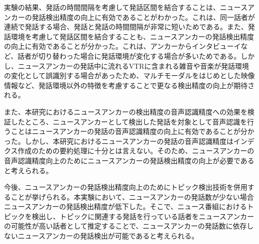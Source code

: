 実験の結果、発話の時間間隔を考慮して発話区間を結合することは、ニュースアンカーの発話検出精度の向上に有効であることがわかった。これは、同一話者が連続で発話する場合、発話と発話の時間間隔が非常に短いためである。また、発話環境を考慮して発話区間を結合することも、ニュースアンカーの発話検出精度の向上に有効であることが分かった。これは、アンカーからインタビューイなど、話者が切り替わった場合に発話環境が変化する場合が多いためである。しかし、ニュースアンカーの発話中に流れるVTRに含まれる雑音や音楽が発話環境の変化として誤識別する場合があったため、マルチモーダルをはじめとした映像情報など、発話環境以外の特徴を考慮することで更なる検出精度の向上が期待される。\par
また、本研究におけるニュースアンカーの検出精度の音声認識精度への効果を検証したところ、ニュースアンカーとして検出した発話を対象として音声認識を行うことはニュースアンカーの発話の音声認識精度の向上に有効であることが分かった。しかし、本研究におけるニュースアンカーの発話の音声認識精度はインデクス作成のための要約処理に十分とは言えない。そのため、ニュースアンカーの音声認識精度向上のためにニュースアンカーの発話検出精度の向上が必要であると考えられる。

今後、ニュースアンカーの発話検出精度向上のためにトピック検出技術を併用することが挙げられる。本実験において、ニュースアンカーの発話数が少ない場合ニュースアンカーの発話検出精度が低下した。そこで、ニュース番組におけるトピックを検出し、トピックに関連する発話を行っている話者をニュースアンカーの可能性が高い話者として推定することで、ニュースアンカーの発話数に依存しないニュースアンカーの発話検出が可能であると考えられる。\par
\begin{comment}
また、ニュース番組のインデクシングを実現するためにはニュースアンカーの発話の検出以外に、アンカーの発話内容を推定する必要がある。現在、「発話区間」「発話者」「発話内容」の全てが未知であるとき、ニュースアンカーの発話の音声認識精度はインデックスの作成に十分とは言えない。特に、ニュースアンカーの発話の音声認識精度が低下した理由として、ニュース番組内のVTRの存在がある。本研究で用いた音声認識システムでは雑音や音楽が同時に収録されていた場合、音声認識精度が極端に低下したため、ニュース番組音声から雑音除去を行う、雑音や音楽に頑健な音声認識システムを構築するなどを行う必要があると考えられる。
\end{comment}

\begin{comment}
ニュースアンカーの発話数によって発話の検出精度が低下した理由として、本研究で用いたニュースアンカーの発話検出手法がニュース番組内において、ニュースアンカーの発話が非常に多いことに着目した手法であるためである。このため、発話の少ないニュースアンカーの発話を十分に検出できず、検出精度が低下したと考えられる。\par
\end{comment}

